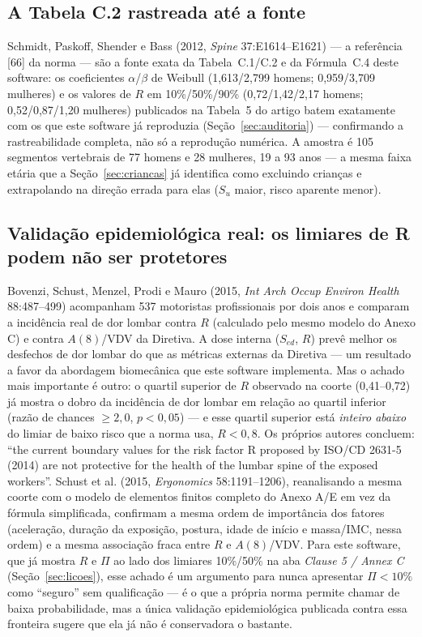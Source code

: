 \documentclass[11pt,a4paper]{article}
\begin{document}
\subsection{A Tabela C.2 rastreada até a fonte}

Schmidt, Paskoff, Shender e Bass (2012, \emph{Spine} 37:E1614--E1621) --- a
referência [66] da norma --- são a fonte exata da Tabela~C.1/C.2 e da
Fórmula~C.4 deste software: os coeficientes $\alpha$/$\beta$ de Weibull
(1,613/2,799 homens; 0,959/3,709 mulheres) e os valores de $R$ em
10\%/50\%/90\% (0,72/1,42/2,17 homens; 0,52/0,87/1,20 mulheres) publicados na
Tabela~5 do artigo batem exatamente com os que este software já reproduzia
(Seção~\ref{sec:auditoria}) --- confirmando a rastreabilidade completa, não só
a reprodução numérica. A amostra é 105 segmentos vertebrais de 77 homens e 28
mulheres, 19 a 93 anos --- a mesma faixa etária que a Seção~\ref{sec:criancas}
já identifica como excluindo crianças e extrapolando na direção errada para
elas ($S_u$ maior, risco aparente menor).

\subsection{Validação epidemiológica real: os limiares de R podem não ser protetores}

Bovenzi, Schust, Menzel, Prodi e Mauro (2015, \emph{Int Arch Occup Environ
Health} 88:487--499) acompanham 537 motoristas profissionais por dois anos e
comparam a incidência real de dor lombar contra $R$ (calculado pelo mesmo
modelo do Anexo C) e contra $A(8)$/VDV da Diretiva. A dose interna ($S_{ed}$,
$R$) prevê melhor os desfechos de dor lombar do que as métricas externas da
Diretiva --- um resultado a favor da abordagem biomecânica que este software
implementa. Mas o achado mais importante é outro: o quartil superior de $R$
observado na coorte (0,41--0,72) já mostra o dobro da incidência de dor lombar
em relação ao quartil inferior (raz\~ao de chances $\geq 2{,}0$, $p<0{,}05$) ---
e esse quartil superior está \emph{inteiro abaixo} do limiar de baixo risco que
a norma usa, $R<0{,}8$. Os próprios autores concluem: ``the current boundary
values for the risk factor R proposed by ISO/CD 2631-5 (2014) are not
protective for the health of the lumbar spine of the exposed workers''. Schust
et al. (2015, \emph{Ergonomics} 58:1191--1206), reanalisando a mesma coorte com
o modelo de elementos finitos completo do Anexo A/E em vez da fórmula
simplificada, confirmam a mesma ordem de importância dos fatores (aceleração,
duração da exposição, postura, idade de início e massa/IMC, nessa ordem) e a
mesma associação fraca entre $R$ e $A(8)$/VDV. Para este software, que já
mostra $R$ e $\Pi$ ao lado dos limiares 10\%/50\% na aba \emph{Clause 5 / Annex
C} (Seção~\ref{sec:licoes}), esse achado é um argumento para nunca apresentar
$\Pi<10\%$ como ``seguro'' sem qualificação --- é o que a própria norma
permite chamar de baixa probabilidade, mas a única validação epidemiológica
publicada contra essa fronteira sugere que ela já não é conservadora o
bastante.
\end{document}
